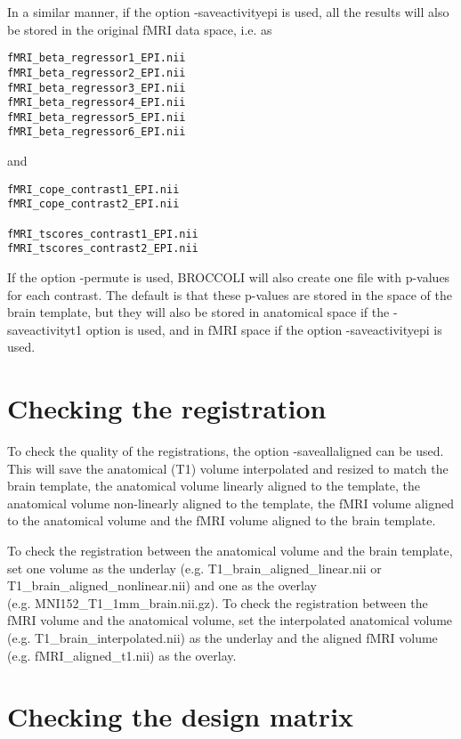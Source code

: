 In a similar manner, if the option -saveactivityepi is used, all the results will also be stored in the original fMRI data space, i.e. as

\begin{verbatim}
fMRI_beta_regressor1_EPI.nii 
fMRI_beta_regressor2_EPI.nii 
fMRI_beta_regressor3_EPI.nii 
fMRI_beta_regressor4_EPI.nii 
fMRI_beta_regressor5_EPI.nii 
fMRI_beta_regressor6_EPI.nii 
\end{verbatim}

and

\begin{verbatim}
fMRI_cope_contrast1_EPI.nii  
fMRI_cope_contrast2_EPI.nii  

fMRI_tscores_contrast1_EPI.nii
fMRI_tscores_contrast2_EPI.nii
\end{verbatim}

If the option -permute is used, BROCCOLI will also create one file with p-values for each contrast. The default is that these p-values are stored in the space of the brain template, but they will also be stored in anatomical space if the -saveactivityt1 option is used, and in fMRI space if the option -saveactivityepi is used.

\section{Checking the registration}

To check the quality of the registrations, the option -saveallaligned can be used. This will save the anatomical (T1) volume interpolated and resized to match the brain template, the anatomical volume linearly aligned to the template, the anatomical volume non-linearly aligned to the template, the fMRI volume aligned to the anatomical volume and the fMRI volume aligned to the brain template. 

To check the registration between the anatomical volume and the brain template, set one volume as the underlay (e.g. T1\_brain\_aligned\_linear.nii or T1\_brain\_aligned\_nonlinear.nii) and one as the overlay \\ (e.g. MNI152\_T1\_1mm\_brain.nii.gz). To check the registration between the fMRI volume and the anatomical volume, set the interpolated anatomical volume (e.g. T1\_brain\_interpolated.nii) as the underlay and the aligned fMRI volume (e.g. fMRI\_aligned\_t1.nii) as the overlay.

\section{Checking the design matrix}

